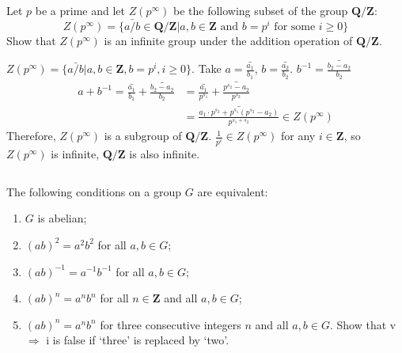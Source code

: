$$ $$

\begin{ex}
    Let $p$ be a prime and let $Z(p^\infty)$ be the following subset of the group $\mathbf{Q}/\mathbf{Z}$:\[Z(p^\infty)=\{\bar{a/b}\in\mathbf{Q}/\mathbf{Z}| a,b \in \mathbf{Z} \text{ and } b=p^i \text{ for some }i\geq 0\}\]
    Show that $Z(p^\infty)$ is an infinite group under the addition operation of $\mathbf{Q}/\mathbf{Z}$.
\end{ex}

\begin{answer}
    $Z(p^\infty)=\{\bar{a/b}|a, b\in\mathbf{Z}, b=p^i, i\geq 0 \}$. Take $a=\bar{\frac{a_1}{b_1}}$, $b=\bar{\frac{a_2}{b_2}}$. $b^{-1}=\bar{\frac{b_2-a_2}{b_2}}$
    \[\begin{aligned}
        a+b^{-1}=\bar{\frac{a_1}{b_1}}+\bar{\frac{b_2-a_2}{b_2}}&=\bar{\frac{a_1}{p^{s_1}}}+\bar{\frac{p^{s_2}-a_2}{p^{s_2}}}\\ &=\bar{\frac{a_1\cdot p^{s_2}+p^{s_1}(p^{s_2}-a_2)}{p^{s_1+s_2}}}\in Z(p^\infty)
    \end{aligned}\]
    Therefore, $Z(p^\infty)$ is a subgroup of $\mathbf{Q}/\mathbf{Z}$. $\frac{1}{p^i}\in Z(p^\infty)$ for any $i \in \mathbf{Z}$, so $Z(p^\infty)$ is infinite, $\mathbf{Q}/\mathbf{Z}$ is also infinite.
\end{answer}

$$ $$

\begin{ex}
    The following conditions on a group $G$ are equivalent:
    \begin{enumerate}[i]
        \item $G$ is abelian;
        \item $(ab)^2=a^{2}b^{2}$ for all $a,b\in G$;
        \item $(ab)^{-1}=a^{-1}b^{-1}$ for all $a,b \in G$;
        \item $(ab)^{n}=a^{n}b^{n}$ for all $n\in \mathbf{Z}$ and all $a,b \in G$;
        \item $(ab)^{n}=a^{n}b^{n}$ for three consecutive integers $n$ and all $a,b \in G$. Show that v$\Rightarrow$ i is false if `three' is replaced by `two'.
    \end{enumerate}
\end{ex}

